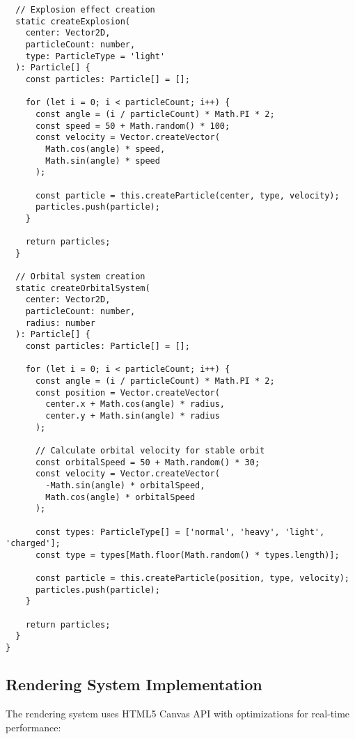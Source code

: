\documentclass[12pt,journal,onecolumn]{IEEEtran}
\begin{document}
\begin{verbatim}
  // Explosion effect creation
  static createExplosion(
    center: Vector2D,
    particleCount: number,
    type: ParticleType = 'light'
  ): Particle[] {
    const particles: Particle[] = [];
    
    for (let i = 0; i < particleCount; i++) {
      const angle = (i / particleCount) * Math.PI * 2;
      const speed = 50 + Math.random() * 100;
      const velocity = Vector.createVector(
        Math.cos(angle) * speed,
        Math.sin(angle) * speed
      );
      
      const particle = this.createParticle(center, type, velocity);
      particles.push(particle);
    }
    
    return particles;
  }

  // Orbital system creation
  static createOrbitalSystem(
    center: Vector2D,
    particleCount: number,
    radius: number
  ): Particle[] {
    const particles: Particle[] = [];
    
    for (let i = 0; i < particleCount; i++) {
      const angle = (i / particleCount) * Math.PI * 2;
      const position = Vector.createVector(
        center.x + Math.cos(angle) * radius,
        center.y + Math.sin(angle) * radius
      );
      
      // Calculate orbital velocity for stable orbit
      const orbitalSpeed = 50 + Math.random() * 30;
      const velocity = Vector.createVector(
        -Math.sin(angle) * orbitalSpeed,
        Math.cos(angle) * orbitalSpeed
      );
      
      const types: ParticleType[] = ['normal', 'heavy', 'light', 'charged'];
      const type = types[Math.floor(Math.random() * types.length)];
      
      const particle = this.createParticle(position, type, velocity);
      particles.push(particle);
    }
    
    return particles;
  }
}
\end{verbatim}

\subsection{Rendering System Implementation}
\label{app:rendering}

The rendering system uses HTML5 Canvas API with optimizations for real-time performance:
\end{document}

